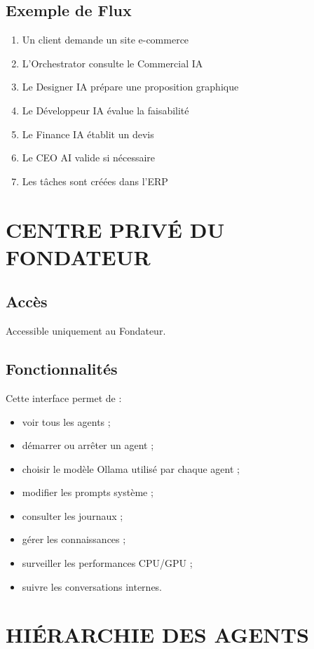\documentclass[12pt,a4paper,oneside]{book}
\begin{document}
\section{Exemple de Flux}
\begin{enumerate}
\item Un client demande un site e-commerce
\item L'Orchestrator consulte le Commercial IA
\item Le Designer IA prépare une proposition graphique
\item Le Développeur IA évalue la faisabilité
\item Le Finance IA établit un devis
\item Le CEO AI valide si nécessaire
\item Les tâches sont créées dans l'ERP
\end{enumerate}

\chapter{CENTRE PRIVÉ DU FONDATEUR}

\section{Accès}
Accessible uniquement au Fondateur.

\section{Fonctionnalités}
Cette interface permet de :
\begin{itemize}
\item voir tous les agents ;
\item démarrer ou arrêter un agent ;
\item choisir le modèle Ollama utilisé par chaque agent ;
\item modifier les prompts système ;
\item consulter les journaux ;
\item gérer les connaissances ;
\item surveiller les performances CPU/GPU ;
\item suivre les conversations internes.
\end{itemize}

\chapter{HIÉRARCHIE DES AGENTS}
\end{document}

